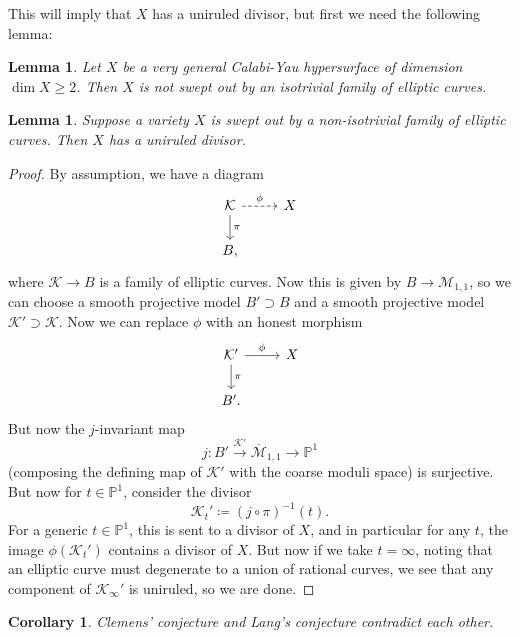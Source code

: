 \documentclass[leqno, openany]{memoir}
\newtheorem{cor}[thm]{Corollary}
\newtheorem{lem}[thm]{Lemma}
\theoremstyle{definition}
\theoremstyle{remark}
\theoremstyle{plain}
\theoremstyle{definition}
\theoremstyle{remark}
\renewcommand{\P}{\mathbb{P}}
\newcommand{\mc}[1]{\mathcal{#1}}
\newcommand{\ol}[1]{\overline{#1}}
\begin{document}
This will imply that $X$ has a uniruled divisor, but first we need the following lemma:

\begin{lem}
    Let $X$ be a very general Calabi-Yau hypersurface of dimension $\dim X \geq 2$. Then $X$ is not swept out by an isotrivial family of elliptic curves.
\end{lem}

\begin{lem}
    Suppose a variety $X$ is swept out by a non-isotrivial family of elliptic curves. Then $X$ has a uniruled divisor.
\end{lem}

\begin{proof}
    By assumption, we have a diagram
    \begin{equation*}
    \begin{tikzcd}
        \mc{K} \ar[dashrightarrow]{r}{\phi} \ar{d}{\pi} & X \\
        B,
    \end{tikzcd}
    \end{equation*}
    where $\mc{K} \to B$ is a family of elliptic curves. Now this is given by $B \to \mc{M}_{1,1}$, so we can choose a smooth projective model $B' \supset B$ and a smooth projective model $\mc{K}' \supset \mc{K}$. Now we can replace $\phi$ with an honest morphism
    \begin{equation*}
    \begin{tikzcd}
        \mc{K}' \ar{r}{\phi} \ar{d}{\pi} & X \\
        B'.
    \end{tikzcd}
    \end{equation*}
    But now the $j$-invariant map
    \[ j \colon B' \xrightarrow{\mc{K}'} \ol{\mc{M}}_{1,1} \to \P^1 \]
    (composing the defining map of $\mc{K}'$ with the coarse moduli space) is surjective. But now for $t \in \P^1$, consider the divisor
    \[ \mc{K}_t' \coloneqq (j \circ \pi)^{-1}(t). \]
    For a generic $t \in \P^1$, this is sent to a divisor of $X$, and in particular for any $t$, the image $\phi(\mc{K}_t')$ contains a divisor of $X$. But now if we take $t = \infty$, noting that an elliptic curve must degenerate to a union of rational curves, we see that any component of $\mc{K}_{\infty}'$ is uniruled, so we are done.
\end{proof}

\begin{cor}
    Clemens' conjecture and Lang's conjecture contradict each other.
\end{cor}
\end{document}
